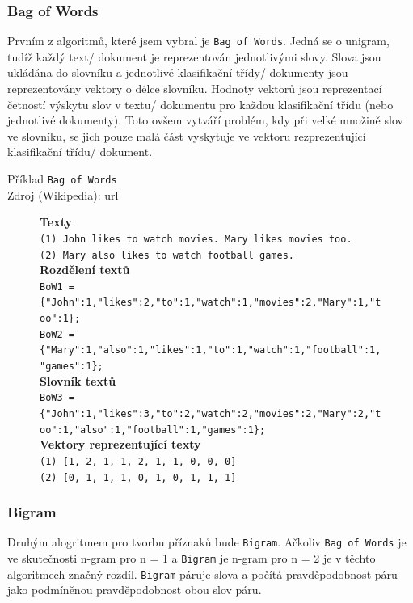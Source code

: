 \documentclass[12pt]{article}
\begin{document}
\subsubsection{Bag of Words}
Prvním z algoritmů, které jsem vybral je \texttt{Bag of Words}. Jedná
se o unigram, tudíž každý text/ dokument je reprezentován jednotlivými
slovy. Slova jsou ukládána do slovníku a jednotlivé klasifikační třídy/
dokumenty
jsou reprezentovány vektory o délce slovníku. Hodnoty vektorů jsou
reprezentací četností výskytu slov v textu/ dokumentu pro každou
klasifikační třídu (nebo jednotlivé dokumenty). Toto ovšem 
vytváří problém, kdy při velké množině slov ve slovníku, se jich pouze
malá část vyskytuje ve vektoru rezprezentující klasifikační třídu/
dokument.

Příklad \texttt{Bag of Words}\\
Zdroj (Wikipedia): url \\
\begin{figure}[H]
	\textbf{Texty}\\
	\texttt{(1) John likes to watch movies. Mary likes movies too.}\\
	\texttt{(2) Mary also likes to watch football games.}\\

	\textbf{Rozdělení textů}\\
	\texttt{BoW1 = \{"John":1,"likes":2,"to":1,"watch":1,"movies":2,"Mary":1,"too":1\};}\\
	\texttt{BoW2 = \{"Mary":1,"also":1,"likes":1,"to":1,"watch":1,"football":1,"games":1\};}\\

	\textbf{Slovník textů}\\
	\texttt{BoW3 = \{"John":1,"likes":3,"to":2,"watch":2,"movies":2,"Mary":2,"too":1,"also":1,"football":1,"games":1\};}\\

	\textbf{Vektory reprezentující texty}\\
	\texttt{(1) [1, 2, 1, 1, 2, 1, 1, 0, 0, 0]}\\
	\texttt{(2) [0, 1, 1, 1, 0, 1, 0, 1, 1, 1]}
\end{figure}
\subsubsection{Bigram}
Druhým alogritmem pro tvorbu příznaků bude \texttt{Bigram}. Ačkoliv 
\texttt{Bag of Words} je ve skutečnosti n-gram pro n = 1 a \texttt{Bigram}
je n-gram pro n = 2 je v těchto algoritmech značný rozdíl. \texttt{Bigram}
páruje slova a počítá pravděpodobnost páru jako podmíněnou pravděpodobnost
obou slov páru.
\end{document}
